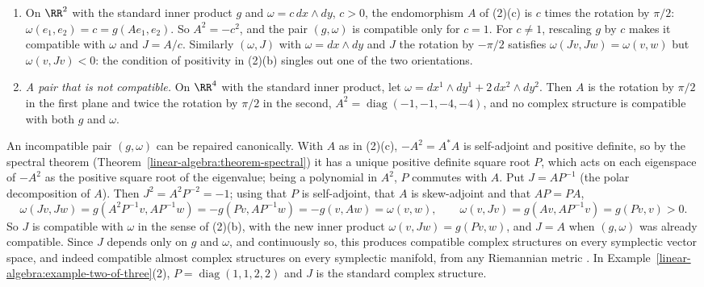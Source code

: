 \begin{example}\label{linear-algebra:example-two-of-three}
\begin{enumerate}
\item On $\RR^2$ with the standard inner product $g$ and $\omega = c\,dx \wedge dy$, $c > 0$, the endomorphism $A$ of (2)(c) is $c$ times the rotation by $\pi/2$: $\omega(e_1, e_2) = c = g(Ae_1, e_2)$.
So $A^2 = -c^2$, and the pair $(g, \omega)$ is compatible only for $c = 1$. For $c \neq 1$, rescaling $g$ by $c$ makes it compatible with $\omega$ and $J = A/c$. Similarly $(\omega, J)$ with
$\omega = dx \wedge dy$ and $J$ the rotation by $-\pi/2$ satisfies $\omega(Jv, Jw) = \omega(v, w)$ but $\omega(v, Jv) < 0$: the condition of positivity in (2)(b) singles out one of the two orientations.
\item \emph{A pair that is not compatible.} On $\RR^4$ with the standard inner product, let $\omega = dx^1 \wedge dy^1 + 2\,dx^2 \wedge dy^2$. Then $A$ is the rotation by $\pi/2$ in the first plane and twice
the rotation by $\pi/2$ in the second, $A^2 = \operatorname{diag}(-1, -1, -4, -4)$, and no complex structure is compatible with both $g$ and $\omega$.
\end{enumerate}
\end{example}

\begin{remark}\label{linear-algebra:remark-polar-compatible}
An incompatible pair $(g, \omega)$ can be repaired canonically. With $A$ as in (2)(c), $-A^2 = A^*A$ is self-adjoint and positive definite, so by the spectral theorem
(Theorem~\ref{linear-algebra:theorem-spectral}) it has a unique positive definite square root $P$, which acts on each eigenspace of $-A^2$ as the positive square root of the eigenvalue; being a
polynomial in $A^2$, $P$ commutes with $A$. Put $J = AP^{-1}$ (the polar decomposition of $A$). Then $J^2 = A^2P^{-2} = -1$; using that $P$ is self-adjoint, that $A$ is skew-adjoint and that $AP = PA$,
\[
\omega(Jv, Jw) = g(A^2P^{-1}v, AP^{-1}w) = -g(Pv, AP^{-1}w) = -g(v, Aw) = \omega(v, w), \qquad \omega(v, Jv) = g(Av, AP^{-1}v) = g(Pv, v) > 0.
\]
So $J$ is compatible with $\omega$ in the sense of (2)(b), with the new inner product $\omega(v, Jw) = g(Pv, w)$, and $J = A$ when $(g, \omega)$ was already compatible. Since $J$ depends only on $g$ and
$\omega$, and continuously so, this produces compatible complex structures on every symplectic vector space, and indeed compatible almost complex structures on every symplectic manifold, from any
Riemannian metric \cite{mcduff-salamon}. In Example~\ref{linear-algebra:example-two-of-three}(2), $P = \operatorname{diag}(1, 1, 2, 2)$ and $J$ is the standard complex structure.
\end{remark}

